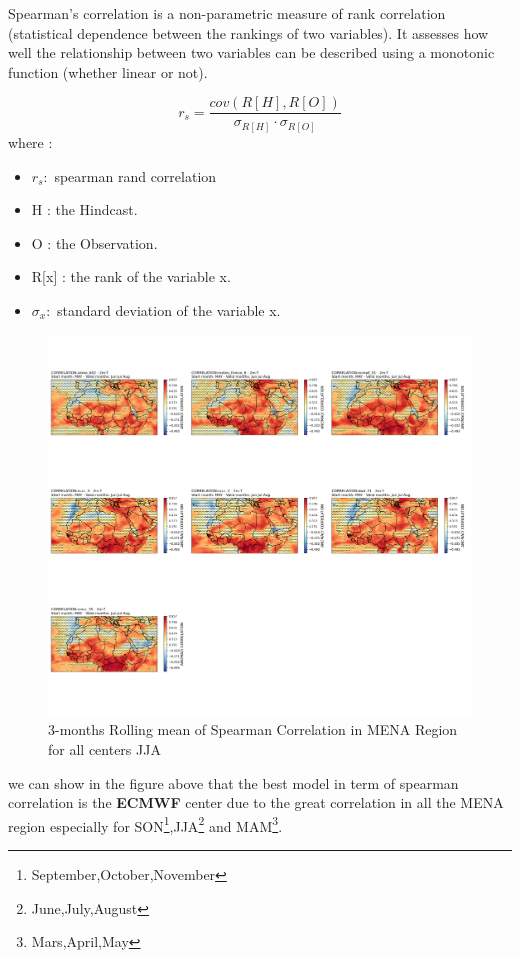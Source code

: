 Spearman's correlation is a non-parametric measure of rank correlation 
(statistical dependence between the rankings of two variables). 
It assesses how well the relationship between two variables can be described using a monotonic function (whether linear or not).  

$$r_s=\frac{cov(R[H],R[O])}{\sigma_{R[H]} \cdot \sigma_{R[O]}}$$
where : \\

\begin{itemize}
	\item $r_s : $ spearman rand correlation 
	\item H : the Hindcast.
	\item O : the Observation.
	\item R[x] : the rank of the variable x. 
	\item $\sigma_x : $ standard deviation of the variable x.
\end{itemize}

\begin{figure}[H]
\includegraphics[scale=0.3]{CORR_JJA.png}
\caption{3-months Rolling mean of Spearman Correlation in MENA Region for all centers JJA}
\end{figure}

we can show in the figure above that the best model in term of spearman correlation is the \textbf{ECMWF} center due to the great correlation in all the MENA region especially for   SON\footnote{September,October,November},JJA\footnote{June,July,August} and MAM\footnote{Mars,April,May}.

